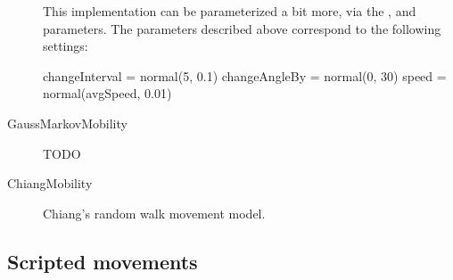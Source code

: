 \begin{description}
This implementation can be parameterized a bit more, via the
,  and  parameters.
The parameters described above correspond to the following settings:

\begin{inifile}
changeInterval = normal(5, 0.1)
changeAngleBy = normal(0, 30)
speed = normal(avgSpeed, 0.01)
\end{inifile}

\item[GaussMarkovMobility] TODO
\item[ChiangMobility] Chiang's random walk movement model.
\end{description}

\subsection{Scripted movements}

